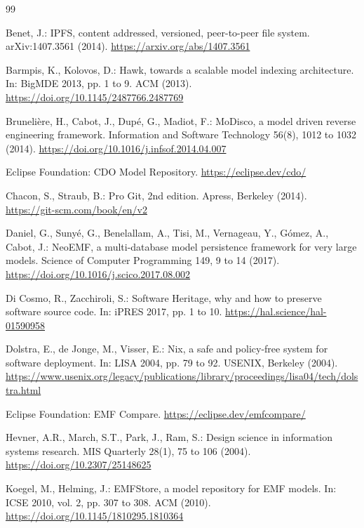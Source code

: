 \documentclass[11pt,a4paper]{article}
\begin{document}
\begin{thebibliography}{99}
\small

Benet, J.: IPFS, content addressed, versioned, peer-to-peer file system. arXiv:1407.3561 (2014). \url{https://arxiv.org/abs/1407.3561}

Barmpis, K., Kolovos, D.: Hawk, towards a scalable model indexing architecture. In: BigMDE 2013, pp. 1 to 9. ACM (2013). \url{https://doi.org/10.1145/2487766.2487769}

Bruneli\`ere, H., Cabot, J., Dup\'e, G., Madiot, F.: MoDisco, a model driven reverse engineering framework. Information and Software Technology 56(8), 1012 to 1032 (2014). \url{https://doi.org/10.1016/j.infsof.2014.04.007}

Eclipse Foundation: CDO Model Repository. \url{https://eclipse.dev/cdo/}

Chacon, S., Straub, B.: Pro Git, 2nd edition. Apress, Berkeley (2014). \url{https://git-scm.com/book/en/v2}

Daniel, G., Suny\'e, G., Benelallam, A., Tisi, M., Vernageau, Y., G\'omez, A., Cabot, J.: NeoEMF, a multi-database model persistence framework for very large models. Science of Computer Programming 149, 9 to 14 (2017). \url{https://doi.org/10.1016/j.scico.2017.08.002}

Di Cosmo, R., Zacchiroli, S.: Software Heritage, why and how to preserve software source code. In: iPRES 2017, pp. 1 to 10. \url{https://hal.science/hal-01590958}

Dolstra, E., de Jonge, M., Visser, E.: Nix, a safe and policy-free system for software deployment. In: LISA 2004, pp. 79 to 92. USENIX, Berkeley (2004). \url{https://www.usenix.org/legacy/publications/library/proceedings/lisa04/tech/dolstra.html}

Eclipse Foundation: EMF Compare. \url{https://eclipse.dev/emfcompare/}

Hevner, A.R., March, S.T., Park, J., Ram, S.: Design science in information systems research. MIS Quarterly 28(1), 75 to 106 (2004). \url{https://doi.org/10.2307/25148625}

Koegel, M., Helming, J.: EMFStore, a model repository for EMF models. In: ICSE 2010, vol. 2, pp. 307 to 308. ACM (2010). \url{https://doi.org/10.1145/1810295.1810364}


\end{thebibliography}
\end{document}
